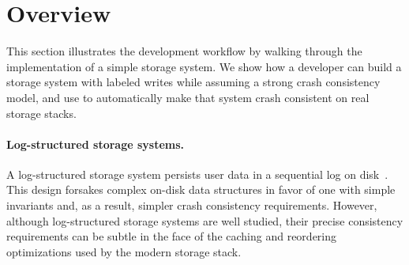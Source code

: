 \section{Overview}
\label{s:overview}

This section illustrates the \depsynth development workflow
by walking through the implementation of a simple storage system.
We show how a developer can build a storage system with labeled writes
while assuming a strong crash consistency model,
and use \depsynth to automatically make that system crash consistent on real storage stacks.

\paragraph{Log-structured storage systems.}
A log-structured storage system
persists user data in a sequential log on disk~\cite{rosenblum:lfs}.
This design forsakes complex on-disk data structures
in favor of one with simple invariants and, as a result, simpler crash consistency requirements.
However, although log-structured storage systems are well studied,
their precise consistency requirements can be subtle
in the face of the caching and reordering optimizations used by the modern storage stack.

